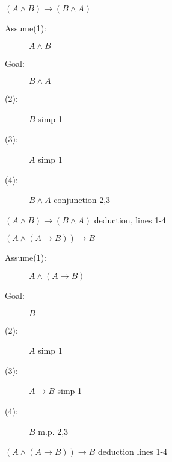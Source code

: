 \documentclass[12pt]{article}
\begin{document}
\begin{enumerate}

\item $(A \wedge B) \rightarrow (B \wedge A)$

\begin{description}

\item

\begin{description}

\item[Assume(1):]  $A \wedge B$

\item[Goal:]  $B \wedge A$

\item[(2):]  $B$ simp 1

\item[(3):]  $A$ simp 1

\item[(4):]  $B \wedge A$ conjunction 2,3



\end{description}

\item[(4):]  $(A \wedge B) \rightarrow (B \wedge A)$  deduction, lines 1-4

\end{description}

\item $(A \wedge (A \rightarrow B)) \rightarrow B$
\begin{description}

\item
\begin{description}

\item[Assume(1):]  $A \wedge (A \rightarrow B)$

\item[Goal:]  $B$

\item[(2):]  $A$ simp 1

\item[(3):]  $A \rightarrow B$  simp 1

\item[(4):]  $B$ m.p. 2,3

\end{description}

\item[(5):]  $(A \wedge (A \rightarrow B)) \rightarrow B$ deduction lines 1-4


\end{description}
\end{enumerate}
\end{document}
